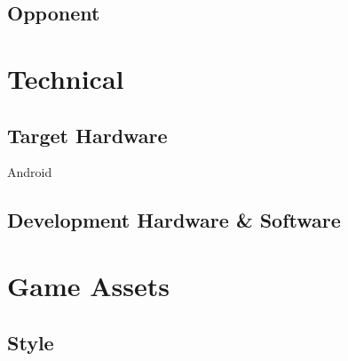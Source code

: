 \documentclass[12pt, letterpaper]{article}
\begin{document}
    \subsection{Opponent}
\section{Technical}
    \subsection{Target Hardware}
    Android
    \subsection{Development Hardware \& Software}
\section{Game Assets}
    \subsection{Style}
\end{document}
